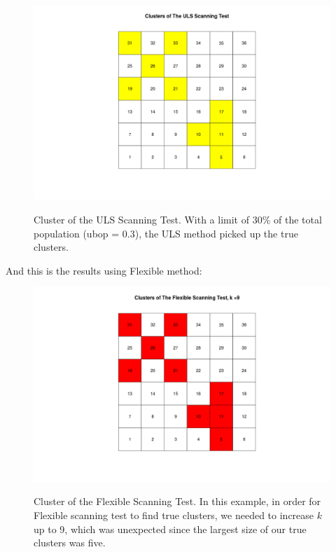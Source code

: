 \documentclass[12pt]{article}
\begin{document}
\begin{figure}[!ht]
	
	\centering
	\includegraphics[scale=0.2]{Ex2_ULS}\\
	\caption{Cluster of the ULS Scanning Test. With a limit of $30 \% $  of the total population (ubop = 0.3), the ULS method picked up the true clusters.\label{f:gull}}
	
\end{figure}






And this is the results using Flexible method:\\

\begin{figure}[!ht]
	
\centering
\includegraphics[scale=0.2]{Ex2_Flexible}\\
\caption{Cluster of the Flexible Scanning Test. In this example, in order for Flexible scanning test to find true clusters, we needed to increase $k$ up to 9, which was unexpected since the largest size of our true clusters was five. \label{f:gull}}

\end{figure}
\end{document}

